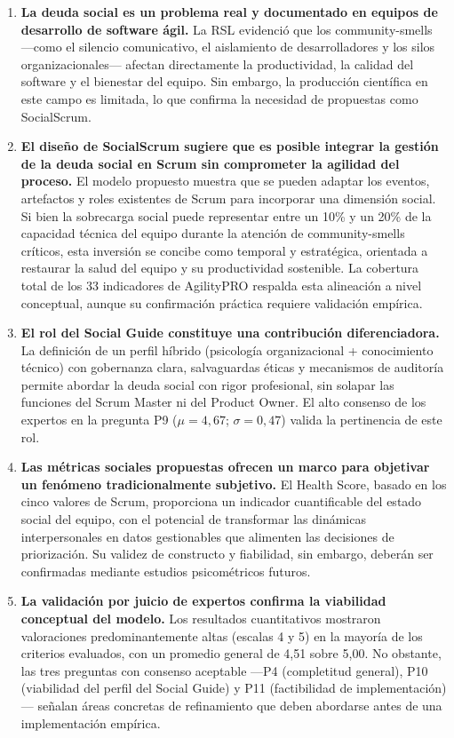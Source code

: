 \begin{enumerate}
    \item \textbf{La deuda social es un problema real y documentado en equipos de desarrollo de software ágil.} La RSL evidenció que los \gls{community-smells} ---como el silencio comunicativo, el aislamiento de desarrolladores y los silos organizacionales--- afectan directamente la productividad, la calidad del software y el bienestar del equipo. Sin embargo, la producción científica en este campo es limitada, lo que confirma la necesidad de propuestas como SocialScrum.

    \item \textbf{El diseño de SocialScrum sugiere que es posible integrar la gestión de la deuda social en Scrum sin comprometer la agilidad del proceso.} El modelo propuesto muestra que se pueden adaptar los eventos, artefactos y roles existentes de Scrum para incorporar una dimensión social. Si bien la sobrecarga social puede representar entre un 10\% y un 20\% de la capacidad técnica del equipo durante la atención de \gls{community-smells} críticos, esta inversión se concibe como temporal y estratégica, orientada a restaurar la salud del equipo y su productividad sostenible. La cobertura total de los 33 indicadores de AgilityPRO respalda esta alineación a nivel conceptual, aunque su confirmación práctica requiere validación empírica.

    \item \textbf{El rol del Social Guide constituye una contribución diferenciadora.} La definición de un perfil híbrido (psicología organizacional + conocimiento técnico) con gobernanza clara, salvaguardas éticas y mecanismos de auditoría permite abordar la deuda social con rigor profesional, sin solapar las funciones del Scrum Master ni del Product Owner. El alto consenso de los expertos en la pregunta P9 ($\mu = 4{,}67$; $\sigma = 0{,}47$) valida la pertinencia de este rol.

    \item \textbf{Las métricas sociales propuestas ofrecen un marco para objetivar un fenómeno tradicionalmente subjetivo.} El Health Score, basado en los cinco valores de Scrum, proporciona un indicador cuantificable del estado social del equipo, con el potencial de transformar las dinámicas interpersonales en datos gestionables que alimenten las decisiones de priorización. Su validez de constructo y fiabilidad, sin embargo, deberán ser confirmadas mediante estudios psicométricos futuros.

    \item \textbf{La validación por juicio de expertos confirma la viabilidad conceptual del modelo.} Los resultados cuantitativos mostraron valoraciones predominantemente altas (escalas 4 y 5) en la mayoría de los criterios evaluados, con un promedio general de 4,51 sobre 5,00. No obstante, las tres preguntas con consenso aceptable ---P4 (completitud general), P10 (viabilidad del perfil del Social Guide) y P11 (factibilidad de implementación)--- señalan áreas concretas de refinamiento que deben abordarse antes de una implementación empírica.


\end{enumerate}
